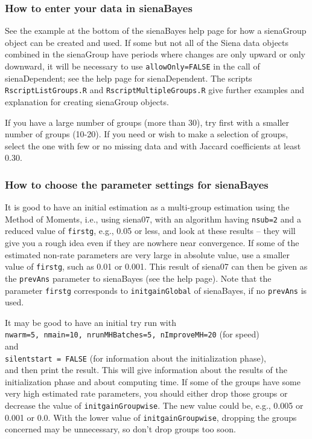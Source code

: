 \documentclass[a4paper,fleqn,11pt]{article}
\newcommand{\+}{\, + \,}
\newcommand{\sfn}[1]{\textsf{#1}}
\begin{document}
\subsubsection{How to enter your data in sienaBayes}

See the example at the bottom of the \sfn{sienaBayes} help page for how a
\sfn{sienaGroup} object can be created and used.
If some but not all of the Siena data objects combined in the \sfn{sienaGroup} have
periods where changes are only upward or only downward,
it will be necessary to use \texttt{allowOnly=FALSE} in the call of
\sfn{sienaDependent}; see the help page for \sfn{sienaDependent}.
The scripts \texttt{RscriptListGroups.R} and \texttt{RscriptMultipleGroups.R}
give further examples and explanation for creating \sfn{sienaGroup} objects.

If you have a large number of groups (more than 30), try first
with a smaller number of groups (10-20). If you need or wish to
make a selection of groups, select the one with few or no missing data and
with Jaccard coefficients at least 0.30.

\subsubsection{How to choose the parameter settings for sienaBayes}
\label{S_sienaBayesParameters}

It is good to have an initial estimation as a multi-group estimation
using the Method of Moments, i.e., using \sfn{siena07}, with
an algorithm having
\texttt{nsub=2} and a reduced value of \texttt{firstg}, e.g.,
0.05 or less, and look at these results --
they will give you a rough idea even if they are nowhere near convergence.
If some of the estimated non-rate parameters are very large
in absolute value, use a smaller value of \texttt{firstg}, such as 0.01 or 0.001.
This result of  \sfn{siena07} can then be given as the \texttt{prevAns}
parameter to \sfn{sienaBayes} (see the help page).
Note that the parameter \texttt{firstg} corresponds to \texttt{initgainGlobal}
of \sfn{sienaBayes}, if no  \texttt{prevAns} is used.

It may be good to have an initial try run with\\
\texttt{nwarm=5, nmain=10, nrunMHBatches=5, nImproveMH=20}
(for speed) \\
and \\
\texttt{silentstart = FALSE} (for information about the
initialization phase),\\
and then \sfn{print} the result.
This will give information about the results of the initialization
phase and about computing time. If some of the groups have some very
high estimated rate parameters, you should either drop those groups
or decrease the value of \texttt{initgainGroupwise}.
The new value could be, e.g., 0.005 or 0.001 or 0.0. With the lower value
of \texttt{initgainGroupwise}, dropping the groups concerned may be unnecessary,
so don't drop groups too soon.
\end{document}
